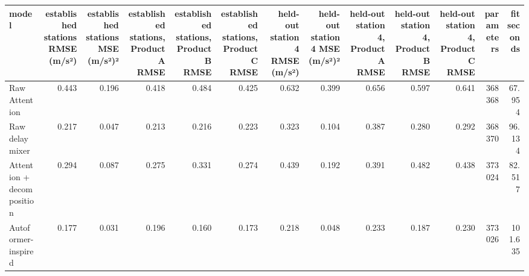 \begin{tabular}{lrrrrrrrrrrrr}
\toprule
model & established stations RMSE (m/s²) & established stations MSE (m/s²)² & established stations, Product A RMSE & established stations, Product B RMSE & established stations, Product C RMSE & held-out station 4 RMSE (m/s²) & held-out station 4 MSE (m/s²)² & held-out station 4, Product A RMSE & held-out station 4, Product B RMSE & held-out station 4, Product C RMSE & parameters & fit seconds \\
\midrule
Raw Attention & 0.443 & 0.196 & 0.418 & 0.484 & 0.425 & 0.632 & 0.399 & 0.656 & 0.597 & 0.641 & 368368 & 67.954 \\
Raw delay mixer & 0.217 & 0.047 & 0.213 & 0.216 & 0.223 & 0.323 & 0.104 & 0.387 & 0.280 & 0.292 & 368370 & 96.134 \\
Attention + decomposition & 0.294 & 0.087 & 0.275 & 0.331 & 0.274 & 0.439 & 0.192 & 0.391 & 0.482 & 0.438 & 373024 & 82.517 \\
Autoformer-inspired & 0.177 & 0.031 & 0.196 & 0.160 & 0.173 & 0.218 & 0.048 & 0.233 & 0.187 & 0.230 & 373026 & 101.635 \\
\bottomrule
\end{tabular}
